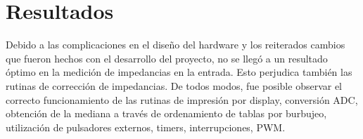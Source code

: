 \section{Resultados}
Debido a las complicaciones en el diseño del hardware y los reiterados cambios que fueron hechos con el desarrollo del proyecto, no se llegó a un resultado óptimo en la medición de impedancias en la entrada. Esto perjudica también las rutinas de corrección de impedancias. 
De todos modos, fue posible observar el correcto funcionamiento de las rutinas de impresión por display, conversión ADC, obtención de la mediana a través de ordenamiento de tablas por burbujeo, utilización de pulsadores externos, timers, interrupciones, PWM.
 


